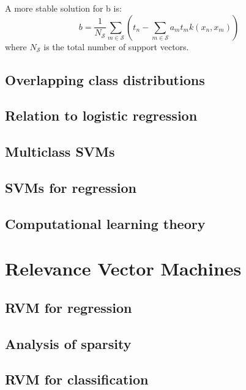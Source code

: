 \documentclass[twoside]{article}
\begin{document}
A more stable solution for b is:
\begin{equation}
b=\frac{1}{N_{\mathcal{S}}} \sum_{m\in \mathcal{S}} (t_n - \sum_{m\in \mathcal{S}} a_mt_mk(x_n, x_m) )
\end{equation}
where $N_{\mathcal{S}}$ is the total number of support vectors.

\subsection{Overlapping class distributions}

\subsection{Relation to logistic regression}

\subsection{Multiclass SVMs}

\subsection{SVMs for regression}

\subsection{Computational learning theory}


\section{Relevance Vector Machines} 

\subsection{RVM for regression}

\subsection{Analysis of sparsity}

\subsection{RVM for classification}
\end{document}
